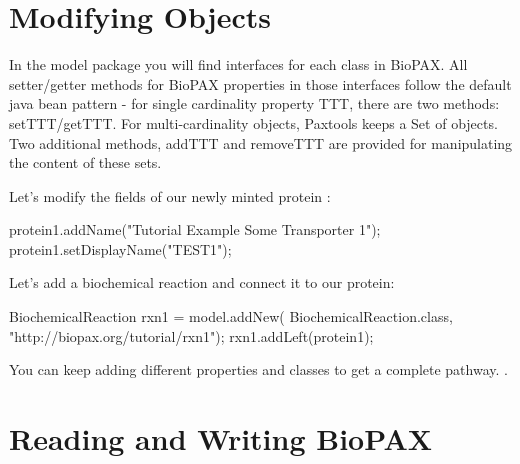 \documentclass{tufte-book}
\begin{document}
\section{Modifying Objects}

In the model package you will find interfaces for each class in BioPAX. All setter/getter methods for BioPAX properties in those interfaces follow the default java bean pattern - for single cardinality property TTT, there are two methods: setTTT/getTTT. For  multi-cardinality objects, Paxtools keeps a Set of objects. Two additional methods, addTTT and removeTTT are provided for manipulating the content of these sets.

Let's modify the fields of our newly minted protein :

\begin{javacode}
protein1.addName("Tutorial Example Some Transporter 1");
protein1.setDisplayName("TEST1");
\end{javacode}

Let's add a biochemical reaction and connect it to our protein:


\begin{javacode}
BiochemicalReaction rxn1 = model.addNew(
	BiochemicalReaction.class,
         "http://biopax.org/tutorial/rxn1");
rxn1.addLeft(protein1);
\end{javacode}

You can keep adding different properties and classes to get a complete pathway. .


\section{Reading and Writing BioPAX }
\end{document}
